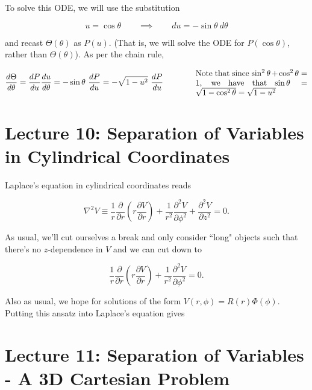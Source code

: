 \documentclass{article}
\numberwithin{equation}{section}
\begin{document}
To solve this ODE, we will use the substitution

\begin{equation*}
    u = \cos{\theta} \qquad \implies \qquad du = -\sin{\theta}\ d\theta
\end{equation*}

and recast $\Theta(\theta)$ as $P(u)$. (That is, we will solve the ODE for $P(\cos{\theta})$, rather than $\Theta(\theta)$). As per the chain rule,

\begin{equation*}
    \frac{d\Theta}{d\theta} = \frac{dP}{du} \frac{du}{d\theta} = -\sin{\theta}\ \frac{dP}{du} = -\sqrt{1 - u^2}\ \frac{dP}{du} \qquad\qquad \parbox[c]{0.4\textwidth}{Note that since $\sin^2{\theta} + \cos^2{\theta} = 1$, we have that $\sin{\theta} = \sqrt{1 - \cos^2{\theta}} = \sqrt{1 - u^2}$}
\end{equation*}

\newpage

\section*{Lecture 10: Separation of Variables in Cylindrical Coordinates}
\setcounter{page}{1}

Laplace's equation in cylindrical coordinates reads

\begin{equation*}
    \nabla^2 V \equiv \frac{1}{r} \frac{\partial}{\partial r} \left( r \frac{\partial V}{\partial r} \right) + \frac{1}{r^2} \frac{\partial^2 V}{\partial \phi^2} + \frac{\partial^2 V}{\partial z^2} = 0.
\end{equation*}

As usual, we'll cut ourselves a break and only consider ``long" objects such that there's no $z$-dependence in $V$ and we can cut down to

\begin{equation*}
    \frac{1}{r} \frac{\partial}{\partial r} \left( r \frac{\partial V}{\partial r} \right) + \frac{1}{r^2} \frac{\partial^2 V}{\partial \phi^2} = 0.
\end{equation*}

Also as usual, we hope for solutions of the form $V(r,\phi) = R(r) \Phi(\phi)$. Putting this ansatz into Laplace's equation gives



\newpage

\section*{Lecture 11: Separation of Variables - A 3D Cartesian Problem}
\setcounter{page}{1}
\end{document}
